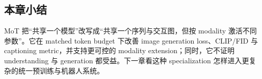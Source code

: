 
\subsection{本章小结}

MoT 把“共享一个模型”改写成“共享一个序列与交互图，但按 modality 激活不同参数”。它在 matched token budget 下改善 image generation loss、CLIP/FID 与 captioning metric，并支持更可控的 modality extension；同时，它不证明 understanding 与 generation 都受益。下一章看这种 specialization 怎样进入更复杂的统一预训练与机器人系统。

